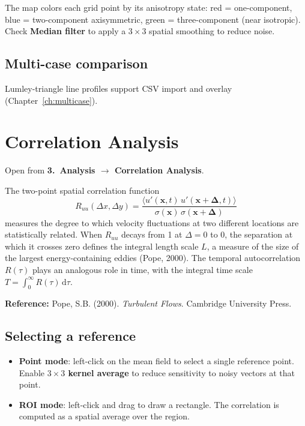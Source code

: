 \documentclass[11pt, a4paper]{report}
\newcommand{\uipth}[1]{\textbf{\textcolor{upblue}{#1}}}
\begin{document}
The map colors each grid point by its anisotropy state: red = one-component, blue = two-component axisymmetric, green = three-component (near isotropic). Check \uipth{Median filter} to apply a $3\times3$ spatial smoothing to reduce noise.

\section{Multi-case comparison}

Lumley-triangle line profiles support CSV import and overlay (Chapter~\ref{ch:multicase}).

\chapter{Correlation Analysis}
\label{ch:correlation}

Open from \uipth{3.\ Analysis $\to$ Correlation Analysis}.

The two-point spatial correlation function
\[
R_{uu}(\Delta x, \Delta y) = \frac{\langle u'(\mathbf{x}, t)\, u'(\mathbf{x}+\boldsymbol{\Delta}, t) \rangle}{\sigma(\mathbf{x})\,\sigma(\mathbf{x}+\boldsymbol{\Delta})}
\]
measures the degree to which velocity fluctuations at two different locations are statistically related. When $R_{uu}$ decays from 1 at $\Delta = 0$ to 0, the separation at which it crosses zero defines the integral length scale $L$, a measure of the size of the largest energy-containing eddies (Pope, 2000). The temporal autocorrelation $R(\tau)$ plays an analogous role in time, with the integral time scale $T = \int_0^{\infty} R(\tau)\,\mathrm{d}\tau$.

\noindent\textbf{Reference:} Pope, S.B. (2000). \textit{Turbulent Flows}. Cambridge University Press.

\section{Selecting a reference}

\begin{itemize}[leftmargin=1.5em]
  \item \uipth{Point mode}: left-click on the mean field to select a single reference point. Enable \uipth{$3\times3$ kernel average} to reduce sensitivity to noisy vectors at that point.
  \item \uipth{ROI mode}: left-click and drag to draw a rectangle. The correlation is computed as a spatial average over the region.
\end{itemize}
\end{document}

